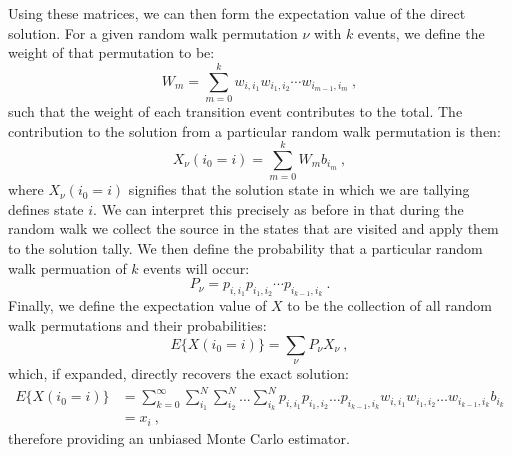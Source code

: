 Using these matrices, we can then form the expectation value of the
direct solution. For a given random walk permutation $\nu$ with $k$
events, we define the weight of that permutation to be:
\begin{equation}
  W_{m} = \sum_{m=0}^k w_{i,i_1} w_{i_1,i_2} \cdots w_{i_{m-1},i_m}\:,
  \label{eq:direct_permutation_weight}
\end{equation}
such that the weight of each transition event contributes to the
total. The contribution to the solution from a particular random walk
permutation is then:
\begin{equation}
  X_{\nu}(i_0 = i) = \sum_{m=0}^k W_{m} b_{i_m}\:,
  \label{eq:direct_permutation_contribution}
\end{equation}
where $X_{\nu}(i_0 = i)$ signifies that the solution state in which we
are tallying defines state $i$.  We can interpret this precisely as
before in that during the random walk we collect the source in the
states that are visited and apply them to the solution tally. We then
define the probability that a particular random walk permuation of $k$
events will occur:
\begin{equation}
  P_{\nu} = p_{i,i_1} p_{i_1,i_2} \cdots p_{i_{k-1},i_k}\:.
  \label{eq:direct_permutation_probability}
\end{equation}
Finally, we define the expectation value of $X$ to be the collection
of all random walk permutations and their probabilities:
\begin{equation}
  E\{X(i_0 = i)\} = \sum_{\nu} P_{\nu} X_{\nu}\:,
  \label{eq:direct_expectation_value}
\end{equation}
which, if expanded, directly recovers the exact solution:
\begin{equation}
  \begin{split}
    E\{X(i_0 = i)\}
    &=\sum_{k=0}^{\infty}\sum_{i_1}^{N}\sum_{i_2}^{N}\ldots
    \sum_{i_k}^{N} p_{i,i_1}p_{i_1,i_2}\ldots p_{i_{k-1},i_k}
    w_{i,i_1}w_{i_1,i_2}\ldots w_{i_{k-1},i_k} b_{i_k}\\ &= x_i\:,
  \end{split}
  \label{eq:direct_expectation_expansion}
\end{equation}
therefore providing an unbiased Monte Carlo estimator. 

